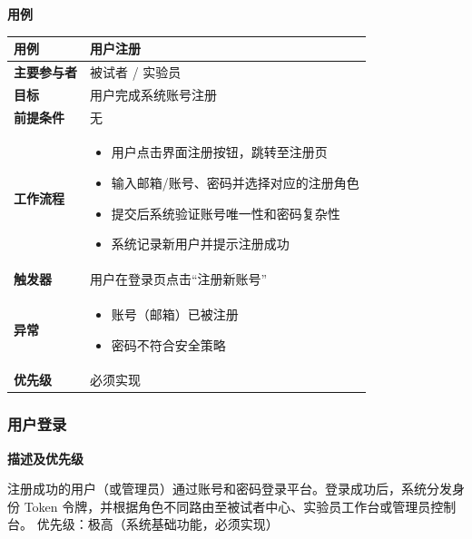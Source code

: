 \textbf{用例}
\begin{table}[H]
    \centering
    \begin{tabular}{|p{3cm}|p{11.5cm}|}
        \hline
        \textbf{用例} & 用户注册 \\
        \hline
        \textbf{主要参与者} & 被试者 / 实验员 \\
        \hline
        \textbf{目标} & 用户完成系统账号注册 \\
        \hline
        \textbf{前提条件} & 无 \\
        \hline
        \textbf{工作流程} & 
        \vspace{-0.3cm}
        \begin{itemize}
            \item 用户点击界面注册按钮，跳转至注册页
            \item 输入邮箱/账号、密码并选择对应的注册角色
            \item 提交后系统验证账号唯一性和密码复杂性
            \item 系统记录新用户并提示注册成功
        \end{itemize} \vspace{-0.3cm} \\
        \hline
        \textbf{触发器} & 用户在登录页点击“注册新账号” \\
        \hline
        \textbf{异常} &
        \vspace{-0.3cm}
        \begin{itemize}
            \item 账号（邮箱）已被注册
            \item 密码不符合安全策略
        \end{itemize} \vspace{-0.3cm} \\
        \hline
        \textbf{优先级} & 必须实现 \\
        \hline
    \end{tabular}
\end{table}

\subsubsection{用户登录}

\textbf{描述及优先级}

注册成功的用户（或管理员）通过账号和密码登录平台。登录成功后，系统分发身份 Token 令牌，并根据角色不同路由至被试者中心、实验员工作台或管理员控制台。
优先级：极高（系统基础功能，必须实现）

